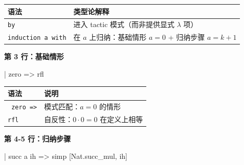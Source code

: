 \documentclass[
  11pt,
  a4paper,
]{ctexrep}
\newenvironment{Shaded}{\begin{snugshade}}{\end{snugshade}}
\newcommand{\NormalTok}[1]{\textcolor[rgb]{0.00,0.23,0.31}{#1}}
\newcounter{none} %
\begin{document}
{\def\LTcaptype{none} %
\begin{longtable}[]{@{}
  >{\raggedright\arraybackslash}p{}
  >{\raggedright\arraybackslash}p{}@{}}
\toprule\noalign{}
\begin{minipage}[b]{\linewidth}\raggedright
语法
\end{minipage} & \begin{minipage}[b]{\linewidth}\raggedright
类型论解释
\end{minipage} \\
\midrule\noalign{}
\endhead
\bottomrule\noalign{}
\endlastfoot
\texttt{by} & 进入 tactic 模式（而非提供显式 \(\lambda\) 项） \\
\texttt{induction\ a\ with} & 在 \(a\) 上归纳：基础情形 \(a=0\) +
归纳步骤 \(a=k+1\) \\
\end{longtable}
}

\textbf{第 3 行：基础情形}

\begin{Shaded}
\begin{Highlighting}[]
\NormalTok{  | zero =\textgreater{} rfl}
\end{Highlighting}
\end{Shaded}

{\def\LTcaptype{none} %
\begin{longtable}[]{@{}ll@{}}
\toprule\noalign{}
语法 & 说明 \\
\midrule\noalign{}
\endhead
\bottomrule\noalign{}
\endlastfoot
\texttt{\textbar{}\ zero\ =\textgreater{}} & 模式匹配：\(a=0\) 的情形 \\
\texttt{rfl} & 自反性：\(0 \cdot 0 = 0\) 在定义上相等 \\
\end{longtable}
}

\textbf{第 4-5 行：归纳步骤}

\begin{Shaded}
\begin{Highlighting}[]
\NormalTok{  | succ a ih =\textgreater{}}
\NormalTok{    simp [Nat.succ\_mul, ih]}
\end{Highlighting}
\end{Shaded}
\end{document}
